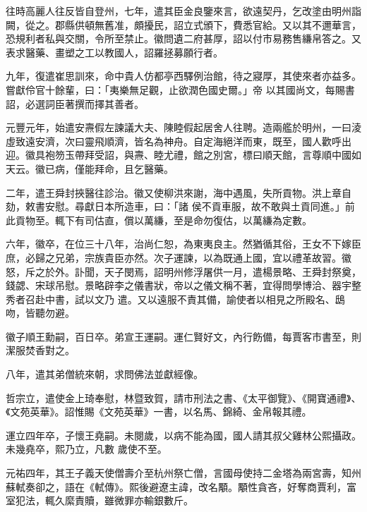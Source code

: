 \begin{pinyinscope}
 往時高麗人往反皆自登州，七年，遣其臣金良鑒來言，欲遠契丹，乞改塗由明州詣闕，從之。郡縣供頓無舊准，頗擾民，詔立式頒下，費悉官給。又以其不邇華言，恐規利者私與交關，令所至禁止。徽問遺二府甚厚，詔以付市易務售縑帛答之。又表求醫藥、畫塑之工以教國人，詔羅拯募願行者。



 九年，復遣崔思訓來，命中貴人仿都亭西驛例治館，待之寢厚，其使來者亦益多。嘗獻伶官十餘輩，曰：「夷樂無足觀，止欲潤色國史爾。」帝
 以其國尚文，每賜書詔，必選詞臣著撰而擇其善者。



 元豐元年，始遣安燾假左諫議大夫、陳睦假起居舍人往聘。造兩艦於明州，一曰淩虛致遠安濟，次曰靈飛順濟，皆名為神舟。自定海絕洋而東，既至，國人歡呼出迎。徽具袍笏玉帶拜受詔，與燾、睦尤禮，館之別宮，標曰順天館，言尊順中國如天云。徽已病，僅能拜命，且乞醫藥。



 二年，遣王舜封挾醫往診治。徽又使柳洪來謝，海中遇風，失所貢物。洪上章自劾，敕書安慰。尋獻日本所造車，曰：「諸
 侯不貢車服，故不敢與土貢同進。」前此貢物至。輒下有司估直，償以萬縑，至是命勿復估，以萬縑為定數。



 六年，徽卒，在位三十八年，治尚仁恕，為東夷良主。然猶循其俗，王女不下嫁臣庶，必歸之兄弟，宗族貴臣亦然。次子運諫，以為既通上國，宜以禮革故習。徽怒，斥之於外。訃聞，天子閔焉，詔明州修浮屠供一月，遣楊景略、王舜封祭奠，錢勰、宋球吊慰。景略辟李之儀書狀，帝以之儀文稱不著，宜得問學博洽、器宇整秀者召赴中書，試以文乃
 遣。又以遠服不責其備，諭使者以相見之所殿名、鴟吻，皆聽勿避。



 徽子順王勳嗣，百日卒。弟宣王運嗣。運仁賢好文，內行飭備，每賈客市書至，則潔服焚香對之。



 八年，遣其弟僧統來朝，求問佛法並獻經像。



 哲宗立，遣使金上琦奉慰，林暨致賀，請市刑法之書、《太平御覽》、《開寶通禮》、《文苑英華》。詔惟賜《文苑英華》一書，以名馬、錦綺、金帛報其禮。



 運立四年卒，子懷王堯嗣。未閱歲，以病不能為國，國人請其叔父雞林公熙攝政。未幾堯卒，熙乃立，凡數
 歲使不至。



 元祐四年，其王子義天使僧壽介至杭州祭亡僧，言國母使持二金塔為兩宮壽，知州蘇軾奏卻之，語在《軾傳》。熙後避遼主諱，改名顒。顒性貪吝，好奪商賈利，富室犯法，輒久縻責贖，雖微罪亦輸銀數斤。




\end{pinyinscope}
